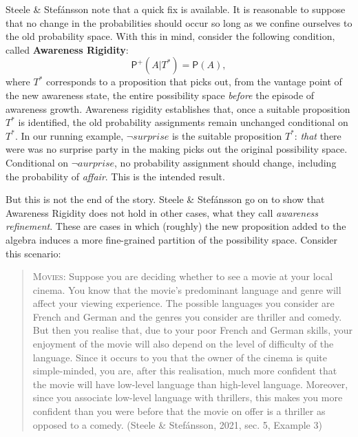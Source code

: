 \documentclass[
  11pt,
  dvipsnames,enabledeprecatedfontcommands]{scrartcl}
\newcommand{\pr}[1]{\ensuremath{\mathsf{P}(#1)}}
\newcommand{\ppr}[2]{\ensuremath{\mathsf{P}^{#1}(#2)}}
\begin{document}
Steele \& Stefánsson note that a quick fix is available. It is
reasonable to suppose that no change in the probabilities should occur
so long as we confine ourselves to the old probability space. With this
in mind, consider the following condition, called
\textbf{Awareness Rigidity}: \[\ppr{+}{A \vert T^*}=\pr{A},\] where
\(T^*\) corresponds to a proposition that picks out, from the vantage
point of the new awareness state, the entire possibility space
\emph{before} the episode of awareness growth. Awareness rigidity
establishes that, once a suitable proposition \(T^*\) is identified, the
old probability assignments remain unchanged conditional on \(T^*\). In
our running example, \(\neg\textit{surprise}\) is the suitable
proposition \(T^*\): \emph{that} there were was no surprise party in the
making picks out the original possibility space. Conditional on
\(\neg\textit{aurprise}\), no probability assignment should change,
including the probability of \textit{affair}. This is the intended
result.

But this is not the end of the story. Steele \& Stefánsson go on to show
that Awareness Rigidity does not hold in other cases, what they call
\emph{awareness refinement}. These are cases in which (roughly) the new
proposition added to the algebra induces a more fine-grained partition
of the possibility space. Consider this scenario:

\begin{quote}
\textsc{Movies}: Suppose you are deciding whether to see a movie at your
local cinema. You know that the movie's predominant language and genre
will affect your viewing experience. The possible languages you consider
are French and German and the genres you consider are thriller and
comedy. But then you realise that, due to your poor French and German
skills, your enjoyment of the movie will also depend on the level of
difficulty of the language. Since it occurs to you that the owner of the
cinema is quite simple-minded, you are, after this realisation, much
more confident that the movie will have low-level language than
high-level language. Moreover, since you associate low-level language
with thrillers, this makes you more confident than you were before that
the movie on offer is a thriller as opposed to a comedy. (Steele \&
Stefánsson, 2021, sec. 5, Example 3)
\end{quote}

\doublespace
\end{document}
